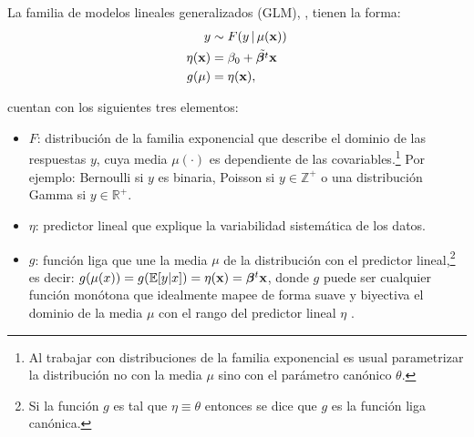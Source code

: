 \documentclass[../Main/Main.tex]{subfiles}
\begin{document}
\begin{definition} La familia de modelos lineales generalizados (GLM), \citet{sundberg2016exponential}, tienen la forma:
\begin{align} 
	y &\sim F(y\,|\,\mu(\mathbf{x})) \label{ec:GLM} \\ 
	\eta(\mathbf{x}) &= \beta_0 + \tilde{\bm{\beta}^t}\mathbf{x} \nonumber \\ 
	g(\mu) &= \eta(\mathbf{x}), \nonumber
\end{align}
\end{definition}
cuentan con los siguientes tres elementos:
\begin{itemize}[label={}]
	\item $F$: distribución de la familia exponencial que describe el dominio de las respuestas $y$, cuya media $\mu(\cdot)$ es dependiente de las covariables.\footnote{Al trabajar con distribuciones de la familia exponencial es usual parametrizar la distribución no con la media $\mu$ sino con el parámetro canónico $\theta$.} Por ejemplo: Bernoulli si $y$ es binaria, Poisson si $y \in \mathbb{Z}^+$ o una distribución Gamma si $y \in \mathbb{R}^+$.
	\item $\eta$: predictor lineal que explique la variabilidad sistemática de los datos.%
	\item $g$: función liga que une la media $\mu$ de la distribución con el predictor lineal,\footnote{Si la función $g$ es tal que $\eta \equiv \theta$ entonces se dice que $g$ es la función liga canónica. } es decir: $g(\mu(x)) = g(\mathbb{E}[y|x]) = \eta(\mathbf{x}) = \bm{\beta}^t
	\mathbf{x}$, donde $g$ puede ser cualquier función monótona que idealmente mapee de forma suave y biyectiva el dominio de la media $\mu$ con el rango del predictor lineal $\eta$ \autocite{hardle2004semiparametric}. 
\end{itemize}
\end{document}
